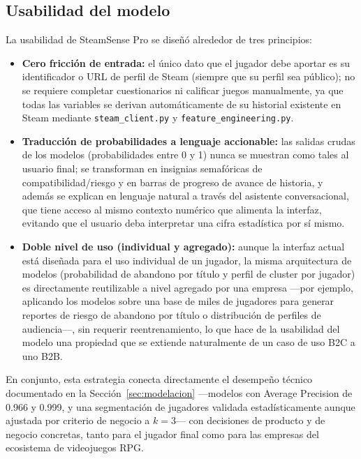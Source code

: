 \documentclass[11pt,letterpaper]{article}
\newcommand{\code}[1]{\texttt{\small #1}}
\begin{document}
\subsection{Usabilidad del modelo}

La usabilidad de SteamSense Pro se diseñó alrededor de tres principios:

\begin{itemize}
  \item \textbf{Cero fricción de entrada:} el único dato que el jugador debe aportar es su identificador o URL de perfil de Steam (siempre que su perfil sea público); no se requiere completar cuestionarios ni calificar juegos manualmente, ya que todas las variables se derivan automáticamente de su historial existente en Steam mediante \code{steam\_client.py} y \code{feature\_engineering.py}.
  \item \textbf{Traducción de probabilidades a lenguaje accionable:} las salidas crudas de los modelos (probabilidades entre 0 y 1) nunca se muestran como tales al usuario final; se transforman en insignias semafóricas de compatibilidad/riesgo y en barras de progreso de avance de historia, y además se explican en lenguaje natural a través del asistente conversacional, que tiene acceso al mismo contexto numérico que alimenta la interfaz, evitando que el usuario deba interpretar una cifra estadística por sí mismo.
  \item \textbf{Doble nivel de uso (individual y agregado):} aunque la interfaz actual está diseñada para el uso individual de un jugador, la misma arquitectura de modelos (probabilidad de abandono por título y perfil de cluster por jugador) es directamente reutilizable a nivel agregado por una empresa ---por ejemplo, aplicando los modelos sobre una base de miles de jugadores para generar reportes de riesgo de abandono por título o distribución de perfiles de audiencia---, sin requerir reentrenamiento, lo que hace de la usabilidad del modelo una propiedad que se extiende naturalmente de un caso de uso B2C a uno B2B.
\end{itemize}

En conjunto, esta estrategia conecta directamente el desempeño técnico documentado en la Sección~\ref{sec:modelacion} ---modelos con Average Precision de 0.966 y 0.999, y una segmentación de jugadores validada estadísticamente aunque ajustada por criterio de negocio a $k=3$--- con decisiones de producto y de negocio concretas, tanto para el jugador final como para las empresas del ecosistema de videojuegos RPG.
\end{document}
